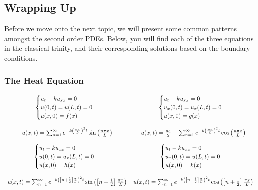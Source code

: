 \documentclass{article}
\begin{document}
\newpage
\subsection{Wrapping Up}
\indent Before we move onto the next topic, we will present some common patterns amongst the second order PDEs. Below, you will find each of the three equations in the classical trinity, and their corresponding solutions based on the boundary conditions.
\subsubsection{The Heat Equation}
\[
\begin{array}{c c}
\begin{cases}
u_{t} - ku_{xx} = 0\\
u(0,t) = u(L,t) = 0\\
u(x,0) = f(x)
\end{cases}
&
\begin{cases}
u_{t} - ku_{xx} = 0\\
u_{x}(0,t) = u_{x}(L,t) = 0\\
u(x,0) = g(x)
\end{cases}\\
&\\
u(x,t) = \sum_{n=1}^{\infty}e^{-k\left(\frac{n\pi}{L}\right)^{2}t}\sin{\left(\frac{n\pi x}{L}\right)}
& u(x,t) = \frac{a_{0}}{2} + \sum_{n=1}^{\infty}e^{-k\left(\frac{n\pi}{L}\right)^{2}t}\cos{\left(\frac{n\pi x}{L}\right)}\\
&\\
\begin{cases}
u_{t} - ku_{xx} = 0\\
u(0,t) = u_{x}(L,t) = 0\\
u(x,0) = h(x)
\end{cases}
&
\begin{cases}
u_{t} - ku_{xx} = 0\\
u_{x}(0,t) = u(L,t) = 0\\
u(x,0) = k(x)
\end{cases}\\
&\\
u(x,t) =  \sum_{n=1}^{\infty}e^{-k\left(\left[n + \frac{1}{2}\right]\frac{\pi}{L}\right)^{2}t}\sin{\left(\left[n + \frac{1}{2}\right]\frac{\pi x}{L}\right)}
& u(x,t) =  \sum_{n=1}^{\infty}e^{-k\left(\left[n + \frac{1}{2}\right]\frac{\pi}{L}\right)^{2}t}\cos{\left(\left[n + \frac{1}{2}\right]\frac{\pi x}{L}\right)}
\end{array}
\]
\noindent\\
\end{document}
